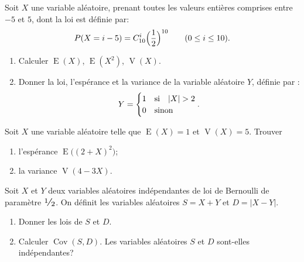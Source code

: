 \documentclass[a4paper,12pt,reqno]{amsart}
\DeclareMathOperator{\E}{E}
\DeclareMathOperator{\V}{V}
\DeclareMathOperator{\Cov}{Cov}
\begin{document}
\begin{exo}

  Soit $X$ une variable aléatoire, prenant toutes les valeurs entières comprises entre $-5$ et $5$, dont la loi est définie par:
    $$
    P(X=i-5)=C_{10}^i\Bigl(\frac{1}{2}\Bigr)^{10}\qquad (0\leq i\leq 10).
    $$

  \begin{enumerate}
    \item Calculer $\E(X)$, $\E(X^2)$, $\V(X)$.
    \item Donner la loi, l'espérance et la variance de la variable aléatoire
    $Y$, définie par :
    $$ Y =
        \begin{cases}
          1 & \text{si\quad} |X| > 2\\
          0 & \text{sinon}
        \end{cases}.
    $$
  \end{enumerate}

\end{exo}

\begin{exo}

  Soit $X$ une variable aléatoire telle que $\E(X)=1$ et $\V(X)=5$. Trouver

  \begin{enumerate}
    \item l'espérance $\E\big((2+X)^2\big)$;
    \item la variance $\V(4-3X)$.
  \end{enumerate}

\end{exo}

\begin{exo}

  Soit $X$ et $Y$ deux variables aléatoires indépendantes de loi de Bernoulli de paramètre $\dsfrac{1}{2}$. On définit les variables aléatoires $S=X+Y$ et $D=|X-Y|$.

  \begin{enumerate}
    \item Donner les lois de $S$ et $D$.
    \item Calculer $\Cov(S,D)$. Les variables aléatoires $S$ et $D$ sont-elles indépendantes?
  \end{enumerate}

\end{exo}
\end{document}
